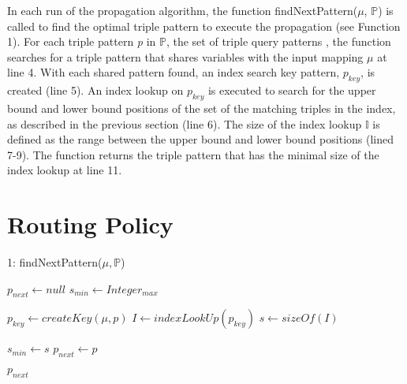 In each run of the propagation algorithm, the function findNextPattern($\mu$, $\mathbb{P}$) is called to find the optimal triple pattern to execute the propagation (see Function 1).
For each triple pattern \textit{p} in $\mathbb{P}$, the set of triple query patterns , the function searches for a triple pattern that shares variables with the input mapping $\mu$ at line 4. With each shared pattern found, an index search key pattern, $p_{key}$, is created (line 5). An index lookup on  $p_{key}$ is executed to search for the upper bound and lower bound positions of the set of the matching triples in the index, as described in the previous section (line 6). The size of the index lookup $\mathbb{I}$ is defined as the range between the upper bound and  lower bound positions (lined 7-9). The function returns the triple pattern that has the minimal size of the index lookup at line 11.


\section{Routing Policy}

\begin{function}[ht!]
\caption{1: findNextPattern($\mu, \mathbb{P}$)}
     
    
    
    $p_{next}\leftarrow null$\;
    $s_{min}\leftarrow Integer_{max}$\;
    
    {
      {
		$p_{key} \leftarrow  createKey(\mu, p)$\;
        $I       \leftarrow  indexLookUp(p_{key})$\;
        $s       \leftarrow  sizeOf(I)$\;
        
        {
           $s_{min}\leftarrow s$\;
           $p_{next}\leftarrow p$\;
        } 
      }
    }
    \Return $p_{next}$\;
\end{function}


